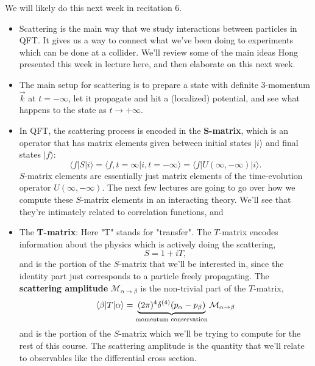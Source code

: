 \documentclass[12pt, oneside]{article}   	%
\theoremstyle{definition}
\begin{document}
{\color{red} We will likely do this next week in recitation 6. }

\begin{itemize}

	\item Scattering is the main way that we study interactions between particles in QFT. It gives us a way to connect what we've been doing to experiments which can be done at a collider. We'll review some of the main ideas Hong presented this week in lecture here, and then elaborate on this next week.
	
	\item The main setup for scattering is to prepare a state with definite 3-momentum $\vec k$ at $t = -\infty$, let it propagate and hit a (localized) potential, and see what happens to the state as $t\rightarrow+\infty$. 
	
	\item In QFT, the scattering process is encoded in the \textbf{S-matrix}, which is an operator that has matrix elements given between initial states $|i\rangle$ and final states $|f\rangle$:
	\begin{equation}
		\langle f | S |i\rangle = \langle f, t = \infty | i, t = -\infty\rangle = \langle f | U(\infty, -\infty) | i\rangle.
	\end{equation}
	$S$-matrix elements are essentially just matrix elements of the time-evolution operator $U(\infty, -\infty)$. The next few lectures are going to go over how we compute these $S$-matrix elements in an interacting theory. We'll see that they're intimately related to correlation functions, and 
	
	\item The \textbf{T-matrix}: Here "T" stands for "transfer". The $T$-matrix encodes information about the physics which is actively doing the scattering,
	\begin{equation}
		S = 1 + i T,
	\end{equation}
	and is the portion of the $S$-matrix that we'll be interested in, since the identity part just corresponds to a particle freely propagating. The \textbf{scattering amplitude} $\mathcal M_{\alpha\rightarrow\beta}$ is the non-trivial part of the $T$-matrix, 
	\begin{equation}
		\langle \beta | T | \alpha\rangle = \underbrace{(2\pi)^4 \delta^{(4)}(p_\alpha - p_\beta)}_{\textnormal{momentum conservation}} \mathcal M_{\alpha\rightarrow\beta}
	\end{equation}
	and is the portion of the $S$-matrix which we'll be trying to compute for the rest of this course. The scattering amplitude is the quantity that we'll relate to observables like the differential cross section. 
	

\end{itemize}
\end{document}
